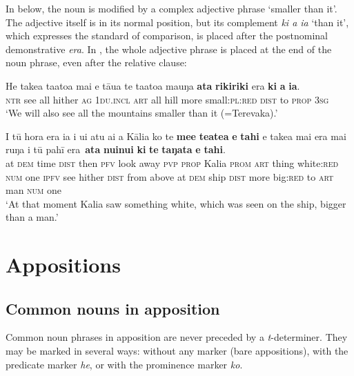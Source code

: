 In  below, the noun is modified by a complex adjective phrase ‘smaller than it’. The adjective itself is in its normal position, but its complement \textit{ki a ia} ‘than it’, which expresses the standard of comparison, is placed after the postnominal demonstrative \textit{era}. In , the whole adjective phrase is placed at the end of the noun phrase, even after the relative clause:

\ea\label{ex:5.163}
\gll He take{\ꞌ}a ta{\ꞌ}ato{\ꞌ}a mai e tāua te ta{\ꞌ}ato{\ꞌ}a ma{\ꞌ}uŋa \textbf{{\ꞌ}ata} \textbf{rikiriki} era  \textbf{ki} \textbf{a} \textbf{ia}.\\
\textsc{ntr} see all hither \textsc{ag} \textsc{1du.incl} \textsc{art} all hill more small:\textsc{pl}:\textsc{red} \textsc{dist}  to \textsc{prop} \textsc{3sg}\\

\glt 
‘We will also see all the mountains smaller than it (=Terevaka).’ \textstyleExampleref{[R314.002]} 
\z

\ea\label{ex:5.164}
\gll {\ꞌ}I tū hora era ia i u{\ꞌ}i atu ai a Kālia ko te \textbf{me{\ꞌ}e} \textbf{teatea} \textbf{e} \textbf{tahi} {\ob}e take{\ꞌ}a mai era mai ruŋa i tū pahī era\,{\cb} \textbf{{\ꞌ}ata} \textbf{nuinui} \textbf{ki} \textbf{te} \textbf{taŋata} \textbf{e} \textbf{tahi}.\\
at \textsc{dem} time \textsc{dist} then \textsc{pfv} look away \textsc{pvp} \textsc{prop} Kalia \textsc{prom} \textsc{art} thing white:\textsc{red}  \textsc{num} one {\db}\textsc{ipfv} see hither \textsc{dist} from above at \textsc{dem} ship \textsc{dist} more big:\textsc{red} to \textsc{art} man \textsc{num} one\\

\glt 
‘At that moment Kalia saw something white, which was seen on the ship, bigger than a man.’ \textstyleExampleref{[R345.061]}\textstyleExampleref{} 
\z
{}
\section{Appositions}\label{sec:5.12}
\subsection{Common nouns in apposition}\label{sec:5.12.1}
Common noun phrases in apposition are never preceded by a \textit{t}{}-determiner. They may be marked in several ways: without any marker (bare appositions), with the predicate marker \textit{he}, or with the prominence marker \textit{ko}.


